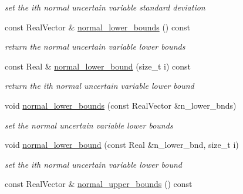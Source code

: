 \begin{DoxyCompactItemize}
\begin{DoxyCompactList}\small\item\em set the ith normal uncertain variable standard deviation \end{DoxyCompactList}\item 
const Real\+Vector \& \hyperlink{classPecos_1_1AleatoryDistParams_a1edc34c0fb14a48173f45c3ffd3254c8}{normal\+\_\+lower\+\_\+bounds} () const \label{classPecos_1_1AleatoryDistParams_a1edc34c0fb14a48173f45c3ffd3254c8}

\begin{DoxyCompactList}\small\item\em return the normal uncertain variable lower bounds \end{DoxyCompactList}\item 
const Real \& \hyperlink{classPecos_1_1AleatoryDistParams_a6c1280d77ff0ac920df0231f7fb4e3fb}{normal\+\_\+lower\+\_\+bound} (size\+\_\+t i) const \label{classPecos_1_1AleatoryDistParams_a6c1280d77ff0ac920df0231f7fb4e3fb}

\begin{DoxyCompactList}\small\item\em return the ith normal uncertain variable lower bound \end{DoxyCompactList}\item 
void \hyperlink{classPecos_1_1AleatoryDistParams_a659abea778d8ad35dbe94b822dc4344a}{normal\+\_\+lower\+\_\+bounds} (const Real\+Vector \&n\+\_\+lower\+\_\+bnds)\label{classPecos_1_1AleatoryDistParams_a659abea778d8ad35dbe94b822dc4344a}

\begin{DoxyCompactList}\small\item\em set the normal uncertain variable lower bounds \end{DoxyCompactList}\item 
void \hyperlink{classPecos_1_1AleatoryDistParams_a74a04fb5c145c1c4099ae839b18a7940}{normal\+\_\+lower\+\_\+bound} (const Real \&n\+\_\+lower\+\_\+bnd, size\+\_\+t i)\label{classPecos_1_1AleatoryDistParams_a74a04fb5c145c1c4099ae839b18a7940}

\begin{DoxyCompactList}\small\item\em set the ith normal uncertain variable lower bound \end{DoxyCompactList}\item 
const Real\+Vector \& \hyperlink{classPecos_1_1AleatoryDistParams_af3bb2aad56c012ecab72afb7f9b0f5c2}{normal\+\_\+upper\+\_\+bounds} () const \label{classPecos_1_1AleatoryDistParams_af3bb2aad56c012ecab72afb7f9b0f5c2}


\end{DoxyCompactItemize}
